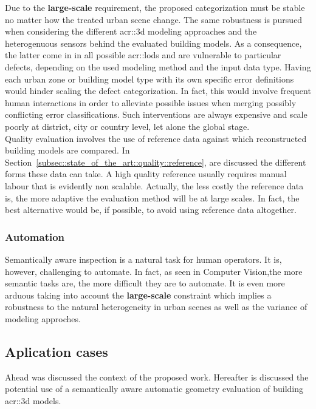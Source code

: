             Due to the \textbf{large-scale} requirement, the proposed categorization must be stable no matter how the treated urban scene change.
            The same robustness is pursued when considering the different \gls{acr::3d} modeling approaches and the heterogenuous sensors behind the evaluated building models.
            As a consequence, the latter come in in all possible \glspl{acr::lod} and are vulnerable to particular defects, depending on the used modeling method and the input data type.
            Having each urban zone or building model type with its own specific error definitions would hinder scaling the defect categorization.
            In fact, this would involve frequent human interactions in order to alleviate possible issues when merging possibly conflicting error classifications.
            Such interventions are always expensive and scale poorly at district, city or country level, let alone the global stage.\\

            Quality evaluation involves the use of reference data against which reconstructed building models are compared.
            In Section~\ref{subsec::state_of_the_art::quality::reference}, are discussed the different forms these data can take.
            A high quality reference usually requires manual labour that is evidently non scalable.
            Actually, the less costly the reference data is, the more adaptive the evaluation method will be at large scales.
            In fact, the best alternative would be, if possible, to avoid using reference data altogether.

        \subsubsection{Automation}
            Semantically aware inspection is a natural task for human operators.
            It is, however, challenging to automate.
            In fact, as seen in Computer Vision,\addref the more semantic tasks are, the more difficult they are to automate.
            It is even more arduous taking into account the \textbf{large-scale} constraint which implies a robustness to the natural heterogeneity in urban scenes as well as the variance of modeling approches.

    \subsection{Aplication cases}
        \label{subsec::introduction::contributions::use}
        Ahead was discussed the context of the proposed work.
        Hereafter is discussed the potential use of a semantically aware automatic geometry evaluation of building \gls{acr::3d} models.
